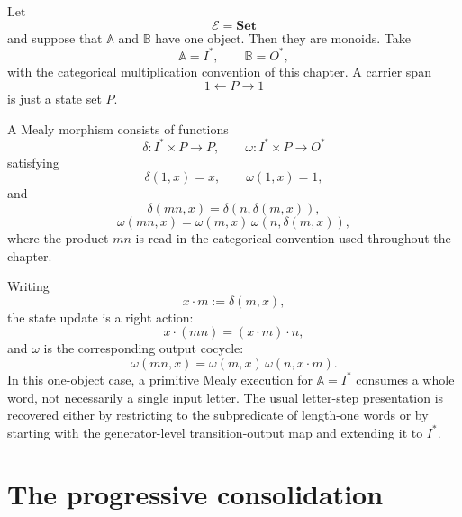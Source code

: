 \begin{example}
\label{ex:classical-mealy-machines-special-case}
Let
\[
\mathcal E=\mathbf{Set}
\]
and suppose that \(\mathbb A\) and \(\mathbb B\) have one object. Then they are monoids. Take
\[
\mathbb A=I^\ast,
\qquad
\mathbb B=O^\ast,
\]
with the categorical multiplication convention of this chapter. A carrier span
\[
1\xleftarrow{}P\xrightarrow{}1
\]
is just a state set \(P\).

A Mealy morphism consists of functions
\[
\delta:I^\ast\times P\to P,
\qquad
\omega:I^\ast\times P\to O^\ast
\]
satisfying
\[
\delta(1,x)=x,
\qquad
\omega(1,x)=1,
\]
and
\[
\delta(mn,x)=\delta(n,\delta(m,x)),
\]
\[
\omega(mn,x)=\omega(m,x)\,\omega(n,\delta(m,x)),
\]
where the product \(mn\) is read in the categorical convention used throughout the chapter.

Writing
\[
x\cdot m:=\delta(m,x),
\]
the state update is a right action:
\[
x\cdot(mn)=(x\cdot m)\cdot n,
\]
and \(\omega\) is the corresponding output cocycle:
\[
\omega(mn,x)=\omega(m,x)\,\omega(n,x\cdot m).
\]
In this one-object case, a primitive Mealy execution for \(\mathbb A=I^\ast\) consumes a whole word, not necessarily a single input letter. The usual letter-step presentation is recovered either by restricting to the subpredicate of length-one words or by starting with the generator-level transition-output map and extending it to \(I^\ast\).
\end{example}

\section{The progressive consolidation}
\label{sec:progressive-consolidation}

